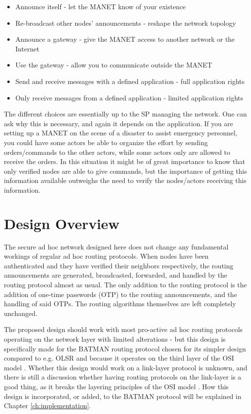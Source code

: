 \begin{itemize}
  \item Announce itself - let the \ac{MANET} know of your existence
  \item Re-broadcast other nodes' announcements - reshape the network topology
  \item Announce a gateway - give the \ac{MANET} access to another network or
  the Internet
  \item Use the gateway - allow you to communicate outside the \ac{MANET}
  \item Send and receive messages with a defined application - full application
  rights
  \item Only receive messages from a defined application - limited application
  rights
\end{itemize}

The different choices are essentially up to the \ac{SP} managing the network.
One can ask why this is necessary, and again it depends on the application. If
you are setting up a \ac{MANET} on the scene of a disaster to assist emergency
personnel, you could have some actors be able to organize the effort by sending
orders/commands to the other actors, while some actors only are allowed to
receive the orders. In this situation it might be of great importance to know
that only verified nodes are able to give commands, but the importance of
getting this information available outweighs the need to verify the nodes/actors
receiving this information.


\section{Design Overview}
The secure ad hoc network designed here does not change any fundamental
workings of regular ad hoc routing protocols. When nodes have been
authenticated and they have verified their neighbors respectively, the routing
announcements are generated, broadcasted, forwarded, and handled by the routing
protocol almost as usual. The only addition to the routing protocol is the
addition of one-time passwords (OTP) to the routing announcements, and the
handling of said \acp{OTP}. The routing algorithms themselves are left
completely unchanged.

The proposed design should work with most pro-active ad hoc routing protocols
operating on the network layer with limited alterations - but this design is
specifically made for the BATMAN \cite{batman_rfc} routing protocol chosen for
its simpler design compared to e.g. OLSR \cite{clausen2003rfc3626} and because
it operates on the third layer of the \ac{OSI} model \cite{zimmermann1980osi}.
Whether this design would work on a link-layer protocol is unknown, and there is
still a discussion whether having routing protocols on the link-layer is a good
thing, as it breaks the layering principles of the \ac{OSI} model
\cite{5680190}. How this design is incorporated, or added, to the BATMAN
protocol will be explained in Chapter \ref{ch:implementation}.


